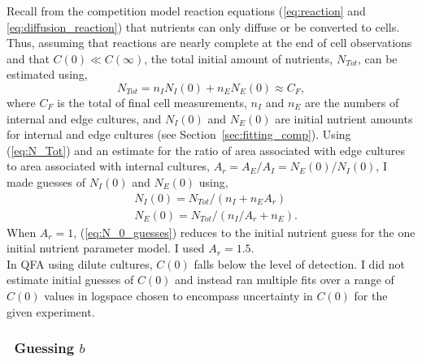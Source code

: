 Recall from the competition model reaction equations
(\ref{eq:reaction} and \ref{eq:diffusion_reaction}) that nutrients can
only diffuse or be converted to cells. Thus, assuming that reactions
are nearly complete at the end of cell observations and that
\(C(0) \ll C(\infty)\), the total initial amount of nutrients,
\(N_{Tot}\), can be estimated using,
\begin{equation}
  \label{eq:N_Tot}
  N_{Tot} = n_{I}N_{I}(0) + n_{E}N_{E}(0) \approx C_{F},
\end{equation}
where \(C_{F}\) is the total of final cell measurements, \(n_{I}\) and
\(n_{E}\) are the numbers of internal and edge cultures, and
\(N_{I}(0)\) and \(N_{E}(0)\) are initial nutrient amounts
for internal and edge cultures (see
Section~\ref{sec:fitting_comp}). Using (\ref{eq:N_Tot}) and an estimate
for the ratio of area associated with edge cultures to area associated
with internal cultures,
\(A_{r} = A_{E} / A_{I} = N_{E}(0) / N_{I}(0)\), I made
guesses of \(N_{I}(0)\) and \(N_{E}(0)\) using,
%
\begin{equation}
  \label{eq:N_0_guesses}
  \begin{aligned}
    &N_{I}(0) = N_{Tot} / (n_{I} + n_{E}A_{r})\\
    &N_{E}(0) = N_{Tot} / (n_{I}/A_{r} + n_{E}).
  \end{aligned}
\end{equation}
%
When \(A_{r} = 1\), (\ref{eq:N_0_guesses}) reduces to the initial
nutrient guess for the one initial nutrient parameter model. I used
\(A_{r} = 1.5\).
\\
In QFA using dilute cultures, \(C(0)\) falls below the level of
detection. I did not estimate initial guesses of \(C(0)\) and instead
ran multiple fits over a range of \(C(0)\) values in logspace chosen
to encompass uncertainty in \(C(0)\) for the given experiment.



\subsubsection{\boldmath \thesubsubsection~Guessing \(b\) \unboldmath}
\label{sec:guessing_b}

